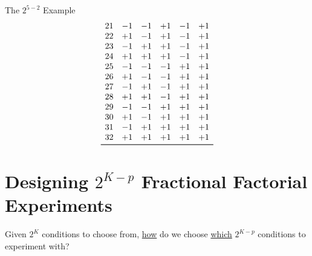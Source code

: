 \begin{itemize}
\begin{Example}{The $ 2^{5-2} $ Example}{}
\[\begin{array}{cccccc}
                      21               & -1              & -1              & +1              & -1              & +1              \\
                      22               & +1              & -1              & +1              & -1              & +1              \\
                      23               & -1              & +1              & +1              & -1              & +1              \\
                      24               & +1              & +1              & +1              & -1              & +1              \\
                      25               & -1              & -1              & -1              & +1              & +1              \\
                      26               & +1              & -1              & -1              & +1              & +1              \\
                      27               & -1              & +1              & -1              & +1              & +1              \\
                      28               & +1              & +1              & -1              & +1              & +1              \\
                      29               & -1              & -1              & +1              & +1              & +1              \\
                      30               & +1              & -1              & +1              & +1              & +1              \\
                      31               & -1              & +1              & +1              & +1              & +1              \\
                      32               & +1              & +1              & +1              & +1              & +1              \\
                      \bottomrule
                  \end{array} \]
          \end{Example}
\end{itemize}
\section{Designing \texorpdfstring{$ 2^{K-p} $}{2K-p} Fractional Factorial Experiments}
Given $ 2^K $ conditions to choose from, \underline{how} do we choose \underline{which}
$ 2^{K-p} $ conditions to experiment with?

